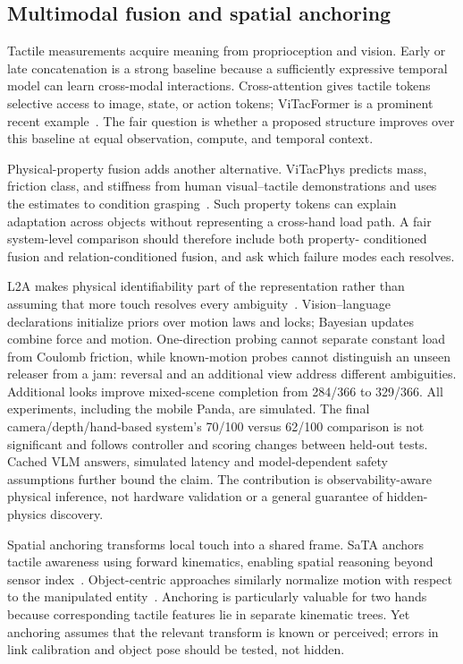 \subsection{Multimodal fusion and spatial anchoring}

Tactile measurements acquire meaning from proprioception and vision. Early or
late concatenation is a strong baseline because a sufficiently expressive
temporal model can learn cross-modal interactions. Cross-attention gives tactile
tokens selective access to image, state, or action tokens; ViTacFormer is a
prominent recent example~\cite{heng2025vitacformer}. The fair question is whether
a proposed structure improves over this baseline at equal observation, compute,
and temporal context.

Physical-property fusion adds another alternative. ViTacPhys predicts mass,
friction class, and stiffness from human visual--tactile demonstrations and uses
the estimates to condition grasping~\cite{liu2026vitacphys}. Such property tokens
can explain adaptation across objects without representing a cross-hand load
path. A fair system-level comparison should therefore include both property-
conditioned fusion and relation-conditioned fusion, and ask which failure modes
each resolves.

L2A makes physical identifiability part of the representation rather than
assuming that more touch resolves every ambiguity~\cite{update2026l2a}.
Vision--language declarations initialize priors over motion laws and locks;
Bayesian updates combine force and motion. One-direction probing cannot separate
constant load from Coulomb friction, while known-motion probes cannot distinguish
an unseen releaser from a jam: reversal and an additional view address different
ambiguities. Additional looks improve mixed-scene completion from 284/366 to
329/366. All experiments, including the mobile Panda, are simulated. The final
camera/depth/hand-based system's 70/100 versus 62/100 comparison is not significant
and follows controller and scoring changes between held-out tests. Cached VLM
answers, simulated latency and model-dependent safety assumptions further bound
the claim. The contribution is observability-aware physical inference, not
hardware validation or a general guarantee of hidden-physics discovery.

Spatial anchoring transforms local touch into a shared frame. SaTA anchors tactile
awareness using forward kinematics, enabling spatial reasoning beyond sensor
index~\cite{huang2025sata}. Object-centric approaches similarly normalize motion
with respect to the manipulated entity~\cite{chen2024objectcentric}. Anchoring is
particularly valuable for two hands because corresponding tactile features lie
in separate kinematic trees. Yet anchoring assumes that the relevant transform is
known or perceived; errors in link calibration and object pose should be tested,
not hidden.


